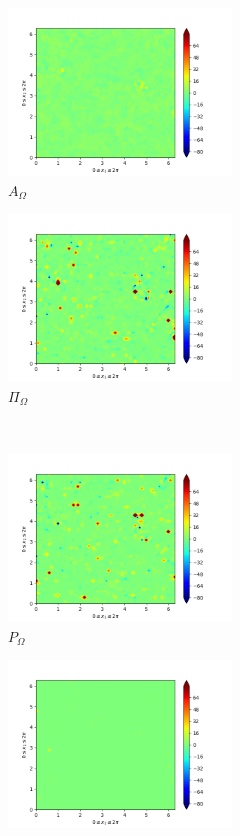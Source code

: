 \begin{figure}[H]
\begin{subfigure}{0.45\textwidth}
        \includegraphics[height=1.75in]{media/run-cds-65/A-enst-1380.png}
        \caption{$A_{\Omega}$}
    \end{subfigure}
    \newline
    \begin{subfigure}{0.45\textwidth}
        \includegraphics[height=1.75in]{media/run-cds-65/Pi-enst-1380.png}
        \caption{$\Pi_{\Omega}$}
    \end{subfigure}
    ~
    \begin{subfigure}{0.45\textwidth}
        \includegraphics[height=1.75in]{media/run-cds-65/P-enst-1380.png}
        \caption{$P_{\Omega}$}
    \end{subfigure}
    \newline
    \begin{subfigure}{0.45\textwidth}
        \includegraphics[height=1.75in]{media/run-cds-65/B-enst-1380.png}

\end{subfigure}
\end{figure}
